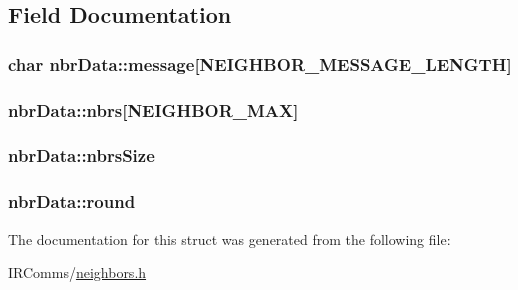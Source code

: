 \subsection{Field Documentation}
\hypertarget{structnbr_data_a8fe2ddd0714d3510cda53342ce42ccf4}{
\subsubsection[{message}]{\setlength{\rightskip}{0pt plus 5cm}char {\bf nbrData::message}\mbox{[}NEIGHBOR\_\-MESSAGE\_\-LENGTH\mbox{]}}}
\label{structnbr_data_a8fe2ddd0714d3510cda53342ce42ccf4}
\hypertarget{structnbr_data_a64816da8a476db5a23d82bb66193db9d}{
\subsubsection[{nbrs}]{ {\bf nbrData::nbrs}\mbox{[}NEIGHBOR\_\-MAX\mbox{]}}}
\label{structnbr_data_a64816da8a476db5a23d82bb66193db9d}
\hypertarget{structnbr_data_a449f41cc135e4d97d3bd56251b3652c8}{
\subsubsection[{nbrsSize}]{ {\bf nbrData::nbrsSize}}}
\label{structnbr_data_a449f41cc135e4d97d3bd56251b3652c8}
\hypertarget{structnbr_data_a46fcb260f89439d589d73a3f100cd738}{
\subsubsection[{round}]{ {\bf nbrData::round}}}
\label{structnbr_data_a46fcb260f89439d589d73a3f100cd738}


The documentation for this struct was generated from the following file:\begin{DoxyCompactItemize}
\item 
IRComms/\hyperlink{neighbors_8h}{neighbors.h}\end{DoxyCompactItemize}
